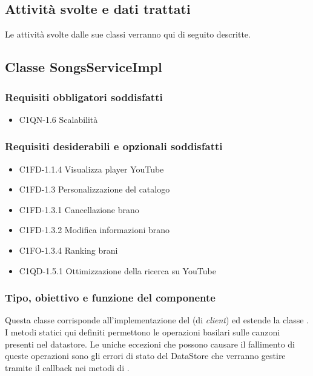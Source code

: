 \subsection*{Attivit\`a svolte e dati trattati}
Le attivit\`a svolte dalle sue classi verranno qui di seguito descritte.

\subsection{Classe SongsServiceImpl}
\subsubsection*{Requisiti obbligatori soddisfatti}
\begin{itemize}
    \item C1QN-1.6 Scalabilit\`a
\end{itemize}
\subsubsection*{Requisiti desiderabili e opzionali soddisfatti}
\begin{itemize}
    \item C1FD-1.1.4 Visualizza player YouTube
    \item C1FD-1.3 Personalizzazione del catalogo
    \item C1FD-1.3.1 Cancellazione brano
    \item C1FD-1.3.2 Modifica informazioni brano
    \item C1FO-1.3.4 Ranking brani
    \item C1QD-1.5.1 Ottimizzazione della ricerca su YouTube
\end{itemize}
\subsubsection*{Tipo, obiettivo e funzione del componente}
Questa classe corrisponde all'implementazione del  (di
\emph{client}) ed estende la classe . I metodi statici
qui definiti permettono le operazioni basilari sulle canzoni presenti nel
datastore. Le uniche eccezioni che possono causare il fallimento di queste
operazioni sono gli errori di stato del DataStore  che
verranno gestire tramite il callback nei metodi di .
